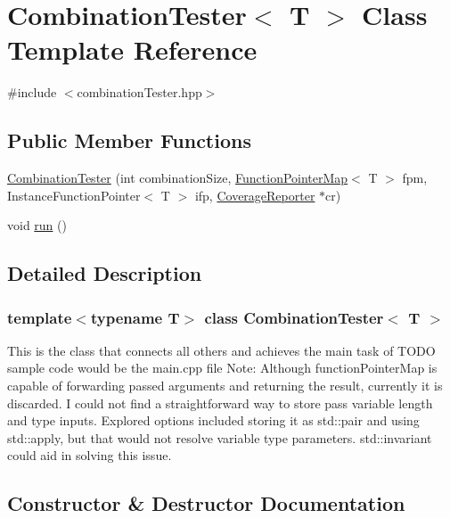 \hypertarget{classCombinationTester}{}\section{Combination\+Tester$<$ T $>$ Class Template Reference}
\label{classCombinationTester}


{\ttfamily \#include $<$combination\+Tester.\+hpp$>$}

\subsection*{Public Member Functions}
\begin{DoxyCompactItemize}
\item 
\hyperlink{classCombinationTester_a9eef45cd51683748083a1148bff36f74}{Combination\+Tester} (int combination\+Size, \hyperlink{classFunctionPointerMap}{Function\+Pointer\+Map}$<$ T $>$ fpm, Instance\+Function\+Pointer$<$ T $>$ ifp, \hyperlink{classCoverageReporter}{Coverage\+Reporter} $\ast$cr)
\item 
void \hyperlink{classCombinationTester_ada3b5998973cb34e6343a971390b3a12}{run} ()
\end{DoxyCompactItemize}


\subsection{Detailed Description}
\subsubsection*{template$<$typename T$>$\newline
class Combination\+Tester$<$ T $>$}

This is the class that connects all others and achieves the main task of T\+O\+DO sample code would be the main.\+cpp file Note\+: Although function\+Pointer\+Map is capable of forwarding passed arguments and returning the result, currently it is discarded. I could not find a straightforward way to store pass variable length and type inputs. Explored options included storing it as std\+::pair and using std\+::apply, but that would not resolve variable type parameters. std\+::invariant could aid in solving this issue. 

\subsection{Constructor \& Destructor Documentation}
\mbox{\label{classCombinationTester_a9eef45cd51683748083a1148bff36f74}} 
